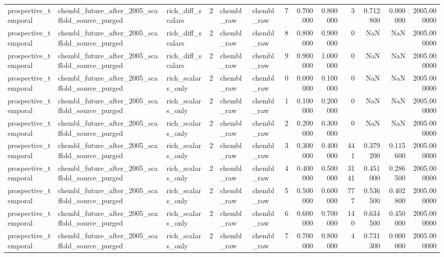 \begin{longtable}{lllrllrrrrrrr}
prospective\_temporal & chembl\_future\_after\_2005\_scaffold\_source\_purged & rich\_diff\_scalars & 2 & chembl\_raw & chembl\_raw & 7 & 0.700000 & 0.800000 & 3 & 0.712800 & 0.000000 & 2005.000000 \\
prospective\_temporal & chembl\_future\_after\_2005\_scaffold\_source\_purged & rich\_diff\_scalars & 2 & chembl\_raw & chembl\_raw & 8 & 0.800000 & 0.900000 & 0 & NaN & NaN & 2005.000000 \\
prospective\_temporal & chembl\_future\_after\_2005\_scaffold\_source\_purged & rich\_diff\_scalars & 2 & chembl\_raw & chembl\_raw & 9 & 0.900000 & 1.000000 & 0 & NaN & NaN & 2005.000000 \\
prospective\_temporal & chembl\_future\_after\_2005\_scaffold\_source\_purged & rich\_scalars\_only & 2 & chembl\_raw & chembl\_raw & 0 & 0.000000 & 0.100000 & 0 & NaN & NaN & 2005.000000 \\
prospective\_temporal & chembl\_future\_after\_2005\_scaffold\_source\_purged & rich\_scalars\_only & 2 & chembl\_raw & chembl\_raw & 1 & 0.100000 & 0.200000 & 0 & NaN & NaN & 2005.000000 \\
prospective\_temporal & chembl\_future\_after\_2005\_scaffold\_source\_purged & rich\_scalars\_only & 2 & chembl\_raw & chembl\_raw & 2 & 0.200000 & 0.300000 & 0 & NaN & NaN & 2005.000000 \\
prospective\_temporal & chembl\_future\_after\_2005\_scaffold\_source\_purged & rich\_scalars\_only & 2 & chembl\_raw & chembl\_raw & 3 & 0.300000 & 0.400000 & 441 & 0.379200 & 0.115600 & 2005.000000 \\
prospective\_temporal & chembl\_future\_after\_2005\_scaffold\_source\_purged & rich\_scalars\_only & 2 & chembl\_raw & chembl\_raw & 4 & 0.400000 & 0.500000 & 3141 & 0.451000 & 0.286500 & 2005.000000 \\
prospective\_temporal & chembl\_future\_after\_2005\_scaffold\_source\_purged & rich\_scalars\_only & 2 & chembl\_raw & chembl\_raw & 5 & 0.500000 & 0.600000 & 777 & 0.536500 & 0.402800 & 2005.000000 \\
prospective\_temporal & chembl\_future\_after\_2005\_scaffold\_source\_purged & rich\_scalars\_only & 2 & chembl\_raw & chembl\_raw & 6 & 0.600000 & 0.700000 & 140 & 0.634500 & 0.450000 & 2005.000000 \\
prospective\_temporal & chembl\_future\_after\_2005\_scaffold\_source\_purged & rich\_scalars\_only & 2 & chembl\_raw & chembl\_raw & 7 & 0.700000 & 0.800000 & 4 & 0.731300 & 0.000000 & 2005.000000 \\

\end{longtable}
